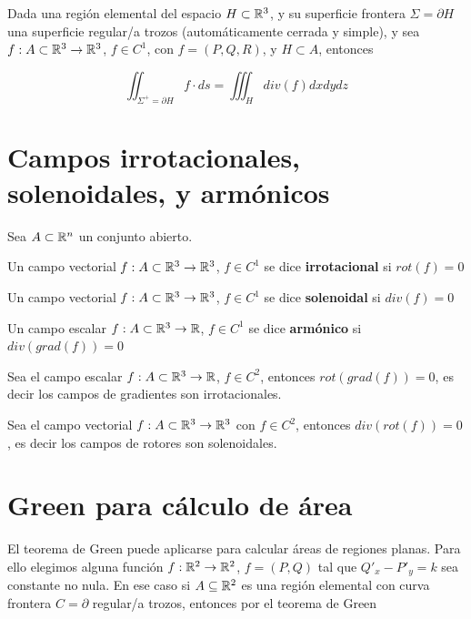 \begin{theorem} 
Dada una región elemental del espacio $H \subset \mathbb{R}^3$, y su superficie frontera $ \Sigma = \partial H$ una superficie regular/a trozos (automáticamente cerrada y simple), y sea $ f : A \subset \mathbb{R}^3 \to \mathbb{R}^3$, $f \in C^1$, con $ f = (P,Q,R)$, y $ H \subset A$, entonces

$$ \displaystyle \iint_{\Sigma^+ = \partial H} f \cdot ds = \iiint_H div(f) dxdydz $$
\end{theorem}

\section{Campos irrotacionales, solenoidales, y armónicos}

\begin{definition}
Sea $A \subset \mathbb{R}^n$ un conjunto abierto.

Un campo vectorial $f: A \subset \mathbb{R}^3 \to \mathbb{R}^3$, $ f \in C^1$ se dice \textbf{irrotacional}  si $ rot(f) = 0$

Un campo vectorial $f: A \subset \mathbb{R}^3 \to \mathbb{R}^3$, $ f \in C^1$ se dice \textbf{solenoidal}  si $ div(f) = 0$

Un campo escalar $ f: A \subset \mathbb{R}^3 \to \mathbb{R}$, $ f \in C^1$ se dice \textbf{armónico}  si $ div(grad(f)) = 0$
\end{definition}

\begin{theorem}
Sea el campo escalar $f: A \subset \mathbb{R}^3 \to \mathbb{R}$, $ f \in C^2$, entonces $ rot(grad(f)) = 0$, es decir los campos de gradientes son irrotacionales.

Sea el campo vectorial $f: A \subset \mathbb{R}^3 \to \mathbb{R}^3$ con $ f \in C^2$, entonces $div(rot(f)) = 0$, es decir los campos de rotores son solenoidales.
\end{theorem}


\section{Green para cálculo de área}

El teorema de Green puede aplicarse para calcular áreas de regiones planas.  Para ello elegimos alguna función $f : \mathbb{R}^2 \to \mathbb{R}^2$, $f = (P,Q)$ tal que $Q'_x - P'_y = k$ sea constante no nula.  En ese caso si $A \subseteq \mathbb{R}^2$ es una región elemental con curva frontera $C = \partial $ regular/a trozos, entonces por el teorema de Green

